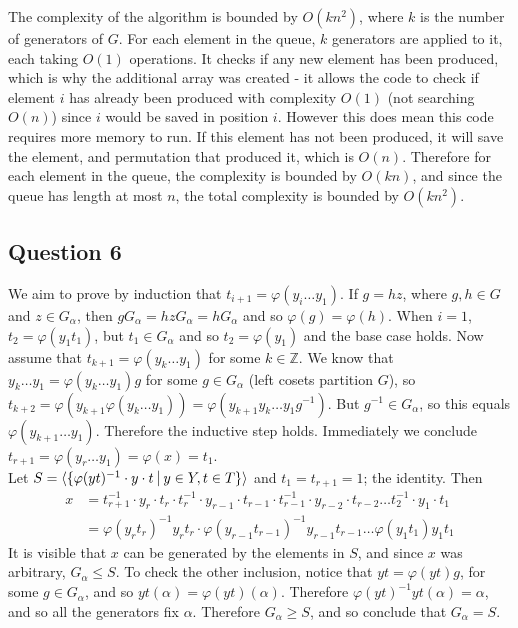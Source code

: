 \documentclass[10pt,a4paper,notitlepage]{article}
\newcommand{\Z}{\mathbb{Z}}
\begin{document}
The complexity of the algorithm is bounded by $O(kn^{2})$, where $k$ is the number of generators of $G$. For each element in the queue, $k$ generators are applied to it, each taking $O(1)$ operations. It checks if any new element has been produced, which is why the additional array was created - it allows the code to check if element $i$ has already been produced with complexity $O(1)$ (not searching $O(n)$) since $i$ would be saved in position $i$. However this does mean this code requires more memory to run. If this element has not been produced, it will save the element, and permutation that produced it, which is $O(n)$. Therefore for each element in the queue, the complexity is bounded by $O(kn)$, and since the queue has length at most $n$, the total complexity is bounded by $O(kn^{2})$.

\subsection*{\centering Question 6}
We aim to prove by induction that $t_{i+1}=\varphi(y_{i}\hdots y_{1})$. If $g=hz$, where $g, h\in G$ and $z\in G_{\alpha}$,  then $gG_{\alpha}=hzG_{\alpha}=hG_{\alpha}$ and so $\varphi(g)=\varphi(h)$. When $i=1$, $t_{2}=\varphi(y_{1}t_{1})$, but $t_{1}\in G_{\alpha}$ and so $t_{2}=\varphi(y_{1})$ and the base case holds. Now assume that $t_{k+1}=\varphi(y_{k}\hdots y_{1})$ for some $k\in \Z$. We know that $y_{k}\hdots y_{1}=\varphi(y_{k}\hdots y_{1}) g$ for some $g\in G_{\alpha}$ (left cosets partition $G$), so $t_{k+2}=\varphi(y_{k+1}\varphi(y_{k}\hdots y_{1}))=\varphi(y_{k+1}y_{k}\hdots y_{1}g^{-1})$. But $g^{-1}\in G_{\alpha}$, so this equals $\varphi(y_{k+1}\hdots y_{1})$. Therefore the inductive step holds. Immediately we conclude $t_{r+1}=\varphi(y_{r}\hdots y_{1})=\varphi(x)=t_{1}$.\\

Let $S=\langle \lbrace \varphi(yt)^{-1}\cdot y\cdot t \,\,\vline \, \, y\in Y, t \in T\rbrace\rangle$ and $t_{1}=t_{r+1}=1$; the identity. Then
\begin{equation*}
\begin{aligned}
x &= t_{r+1}^{-1}\cdot y_{r}\cdot t_{r}\cdot t_{r}^{-1}\cdot y_{r-1}\cdot t_{r-1} \cdot t_{r-1}^{-1} \cdot y_{r-2} \cdot t_{r-2} \hdots t_{2}^{-1}\cdot y_{1}\cdot t_{1}\\
&=\varphi(y_{r}t_{r})^{-1}y_{r}t_{r}\cdot \varphi(y_{r-1}t_{r-1})^{-1}y_{r-1}t_{r-1}\hdots \varphi(y_{1}t_{1})y_{1}t_{1}
\end{aligned}
\end{equation*}
It is visible that $x$ can be generated by the elements in $S$,  and since $x$ was arbitrary, $G_{\alpha}\leq S$. To check the other inclusion, notice that $yt=\varphi(yt)g$, for some $g\in G_{\alpha}$, and so $yt(\alpha)=\varphi(yt)(\alpha)$. Therefore $\varphi(yt)^{-1}yt(\alpha)=\alpha$, and so all the generators fix $\alpha$. Therefore $G_{\alpha}\geq S$, and so conclude that $G_{\alpha}=S$.\\
\end{document}
